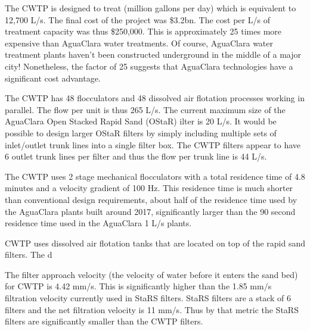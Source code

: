 \documentclass[letterpaper,10pt,english]{sphinxmanual}
\begin{document}
\begin{description}
The CWTP is designed to treat  (million gallons per day) which is equivalent to 12,700 L/s. The final cost of the project was \$3.2bn. The cost per L/s of treatment capacity was thus \$250,000. This is approximately 25 times more expensive than AguaClara water treatments. Of course, AguaClara water treatment plants haven’t been constructed underground in the middle of a major city! Nonetheless, the factor of 25 suggests that AguaClara technologies have a significant cost advantage.

The CWTP has 48 flocculators and 48 dissolved air flotation processes working in parallel. The flow per unit is thus 265 L/s. The current maximum size of the AguaClara Open Stacked Rapid Sand (OStaR) ilter is 20 L/s. It would be possible to design larger OStaR filters by simply including multiple sets of inlet/outlet trunk lines into a single filter box. The CWTP filters appear to have 6 outlet trunk lines per filter and thus the flow per trunk line is 44 L/s.

The CWTP uses 2 stage mechanical flocculators with a total residence time of 4.8 minutes and a velocity gradient of 100 Hz. This residence time is much shorter than conventional design requirements, about half of the residence time used by the AguaClara plants built around 2017, significantly larger than the 90 second residence time used in the AguaClara 1 L/s plants.

CWTP uses dissolved air flotation tanks that are located on top of the rapid sand filters. The d

The filter approach velocity (the velocity of water before it enters the sand bed) for CWTP is 4.42 mm/s. This is significantly higher than the 1.85 mm/s filtration velocity currently used in StaRS filters. StaRS filters are a stack of 6 filters and the net filtration velocity is 11 mm/s. Thus by that metric the StaRS filters are significantly smaller than the CWTP filters.


\end{description}
\end{document}
